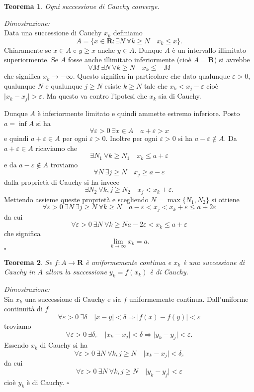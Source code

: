 \documentclass[italian,a4paper]{article}
\newcommand{\R}{\mathbf{R}}
\renewcommand{\epsilon}{\varepsilon}
\newtheorem{theorem}{Teorema}
\newenvironment{proof}
        {%
                {}%
                {%
                }%
        \noindent%
        {\it Dimostrazione:}\\%
        }%
        {%
        \hfill$\square$%
        }
\begin{document}
\begin{theorem}
Ogni successione di Cauchy converge.
\end{theorem}
\begin{proof}
Data una successione di Cauchy $x_k$ definiamo
\[
	A=\{x\in\R \colon \exists N\ \forall k\ge N\quad x_k\le x\}.
\]
Chiaramente se $x\in A$ e $y\ge x$ anche $y\in A$. Dunque $A$ \`e un
intervallo illimitato superiormente.
Se $A$ fosse anche illimitato inferiormente (cio\`e $A=\R$) si avrebbe 
\[
	\forall M\  \exists N\ \forall k\ge N\quad x_k \le -M
\]
che significa $x_k\to -\infty$. Questo significa in particolare che
dato qualunque $\epsilon>0$, qualunque $N$ e qualunque $j\ge N$ 
esiste $k\ge N$ tale che
$x_k< x_j - \epsilon$ cio\`e $\vert x_k - x_j\vert > \epsilon$. Ma
questo va contro l'ipotesi che $x_k$ sia di Cauchy.

Dunque $A$ \`e inferiormente limitato e quindi ammette estremo
inferiore. Posto $a=\inf A$ si ha
\[
	\forall \epsilon>0\ \exists x\in A\quad a+\epsilon> x
\]
e quindi $a+\epsilon \in A$ per ogni $\epsilon>0$. Inoltre per ogni
$\epsilon>0$ si ha $a-\epsilon\not\in A$.
Da $a+\epsilon\in A$ ricaviamo che
\[
	\exists N_1\ \forall k\ge N_1 \quad x_k \le a+\epsilon
\]
e da $a-\epsilon \not \in A$ troviamo
\[
	\forall N\ \exists j \ge N \quad x_j \ge a-\epsilon
\]
dalla propriet\`a di Cauchy si ha invece
\[
	\exists N_2\ \forall k,j\ge N_2 \quad x_j < x_k  + \epsilon.
\]
Mettendo assieme queste propriet\`a e scegliendo $N=\max \{N_1,N_2\}$
si ottiene
\[
	\forall \epsilon>0\ \exists N\ 
	\exists j\ge N\ \forall k\ge N\quad a-\epsilon< x_j <
	x_k+\epsilon
	\le a + 2\epsilon
\]
da cui
\[
	\forall \epsilon>0\ \exists N\ \forall k\ge N
	a-2\epsilon < x_k \le a+\epsilon 
\]
che significa 
\[
	\lim_{k\to\infty} x_k =a.
\]
\end{proof}

\begin{theorem}
Se $f\colon A\to \R$ \`e uniformemente continua e $x_k$ \`e una
successione di Cauchy in $A$ allora la successione $y_k=f(x_k)$ \`e di Cauchy.
\end{theorem}
\begin{proof}
Sia $x_k$ una successione di Cauchy e sia $f$ uniformemente continua.
Dall'uniforme continuit\`a di $f$ 
\[
	\forall \epsilon>0\ \exists \delta \quad \vert x-y\vert <
	\delta
	\Rightarrow \vert f(x)-f(y)\vert <\epsilon
\]
troviamo
\[
	\forall \epsilon>0\ \exists \delta_\epsilon\quad
	\vert x_k - x_j\vert < \delta \Rightarrow \vert y_k - y_j\vert <\epsilon.
\]
Essendo $x_k$ di Cauchy si ha
\[
	\forall \epsilon>0\ \exists N\ \forall k,j\ge N\quad
	\vert x_k -x_j\vert <\delta_\epsilon
\]
da cui
\[
	\forall \epsilon>0\ \exists N\ \forall k,j\ge N\quad
	\vert y_k - y_j\vert < \epsilon
\]
cio\`e $y_k$ \`e di Cauchy.
\end{proof}
\end{document}

